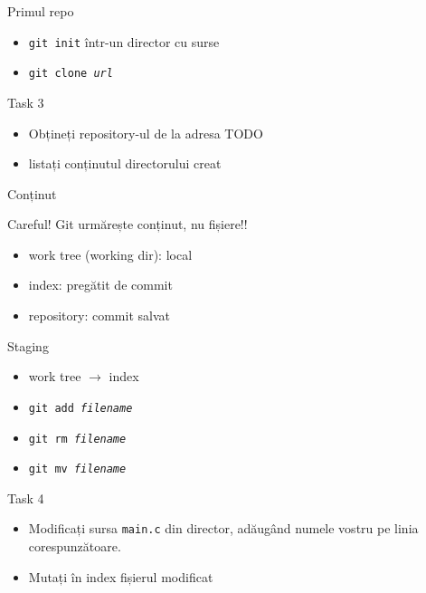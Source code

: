 \documentclass{beamer}
\begin{document}
\begin{frame}{Primul repo}
  \begin{itemize}
    \item \texttt{git init} într-un director cu surse
    \item \texttt{git clone \textit{url}}
  \end{itemize}
  \pause
  \begin{alertblock}{Task 3}
    \begin{itemize}
      \item Obțineți repository-ul de la adresa TODO
      \item listați conținutul directorului creat
    \end{itemize}
  \end{alertblock}
\end{frame}

\begin{frame}[label=Content]{Conținut}
  \begin{alertblock}{Careful!}
    Git urmărește conținut, nu fișiere!!
  \end{alertblock}
  \begin{itemize}
    \item work tree (working dir): local
    \item index: pregătit de commit
    \item repository: commit salvat
  \end{itemize}
\end{frame}

\begin{frame}{Staging}
  \begin{itemize}
    \item work tree $\rightarrow$ index
    \item \texttt{git add \textit{filename}}
    \item \texttt{git rm \textit{filename}}
    \item \texttt{git mv \textit{filename}}
  \end{itemize}
  \pause
  \begin{alertblock}{Task 4}
    \begin{itemize}
      \item Modificați sursa \texttt{main.c} din director, adăugând numele vostru pe linia
      corespunzătoare.
      \item Mutați în index fișierul modificat
    \end{itemize}
  \end{alertblock}
\end{frame}
\end{document}
